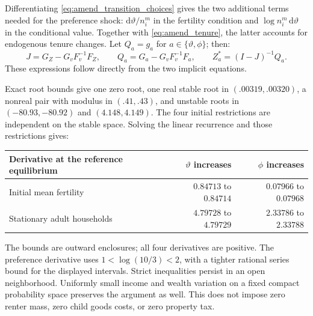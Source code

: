 \documentclass[11pt]{article}
\newcommand{\dd}{\mathrm d}
\begin{document}
Differentiating \eqref{eq:amend_transition_choices} gives the two additional
terms needed for the preference shock: $\dd\vartheta/n_i^m$ in the fertility
condition and $\log n_i^m\,\dd\vartheta$ in the conditional value.
Together with \eqref{eq:amend_tenure}, the latter accounts for endogenous
tenure changes. Let $Q_a=g_a$ for $a\in\{\vartheta,\phi\}$; then:
\begin{equation}
 J=G_Z-G_vF_v^{-1}F_Z,\qquad
 Q_a=G_a-G_vF_v^{-1}F_a,\qquad
 Z_a^*=(I-J)^{-1}Q_a.
 \label{eq:amend_example_derivatives}
\end{equation}
These expressions follow directly from the two implicit equations.

Exact root bounds give one zero root, one real stable root in
$(.00319,.00320)$, a nonreal pair with modulus in $(.41,.43)$, and
unstable roots in $(-80.93,-80.92)$ and $(4.148,4.149)$.
The four initial restrictions are independent on the stable space.
Solving the linear recurrence and those restrictions gives:
\begin{center}
\begin{tabular}{@{}lrr@{}}
\toprule
Derivative at the reference equilibrium & $\vartheta$ increases & $\phi$ increases\\
\midrule
Initial mean fertility & $0.84713$ to $0.84714$ & $0.07966$ to $0.07968$\\
Stationary adult households & $4.79728$ to $4.79729$ & $2.33786$ to $2.33788$\\
\bottomrule
\end{tabular}
\end{center}
The bounds are outward enclosures; all four derivatives are positive.
The preference derivative uses $1<\log(10/3)<2$, with a tighter rational
series bound for the displayed intervals. Strict inequalities persist in
an open neighborhood. Uniformly small income and wealth variation on a
fixed compact probability space preserves the argument as well. This does
not impose zero renter mass, zero child goods costs, or zero property tax.
\end{document}
